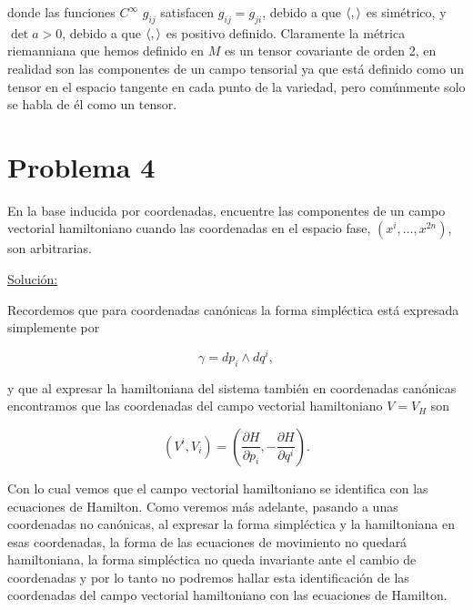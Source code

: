 \documentclass[a4paper,10pt]{article}
\numberwithin{equation}{section}
\begin{document}
donde las funciones $C^\infty$ $g_{ij}$ satisfacen $g_{ij} = g_{ji}$, debido 
a que $\langle \space , \space \rangle$ es simétrico, y $\det{a} > 0$, debido a
que $\langle \space , \space \rangle$ es positivo definido. Claramente la métrica 
riemanniana que hemos definido en $M$ es un tensor covariante de orden 2, en realidad 
son las componentes de un campo tensorial ya que está definido como un tensor 
en el espacio tangente en cada punto de la variedad, pero comúnmente 
solo se habla de él como un tensor.


\section{Problema 4}

En la base inducida por coordenadas, encuentre las componentes de un campo vectorial 
hamiltoniano cuando las coordenadas en el espacio fase, $(x^i,\dots,x^{2n})$, son 
arbitrarias.

\vspace{.3cm}

\underline{Solución:} \vspace{.3cm}

Recordemos que para coordenadas canónicas la forma simpléctica está expresada 
simplemente por 

\begin{equation}
 \gamma = dp_i \wedge dq^i,
\end{equation}

y que al expresar la hamiltoniana del sistema también en coordenadas canónicas 
encontramos que las coordenadas del campo vectorial hamiltoniano $V = V_H$ son 

\begin{equation}
 (V^i,V_i) = \left(\frac{\partial H}{\partial p_i}, - \frac{\partial H}{\partial q^i}\right).
\end{equation}

Con lo cual vemos que el campo vectorial hamiltoniano se identifica con las ecuaciones de 
Hamilton. Como veremos más adelante, pasando a unas coordenadas no canónicas, al expresar 
la forma simpléctica y la hamiltoniana en esas coordenadas, la forma de las ecuaciones de 
movimiento no quedará hamiltoniana, la forma simpléctica no queda invariante ante 
el cambio de coordenadas y por lo tanto no podremos hallar esta identificación de las 
coordenadas del campo vectorial hamiltoniano con las ecuaciones de Hamilton.

\vspace{.3cm}
\end{document}
